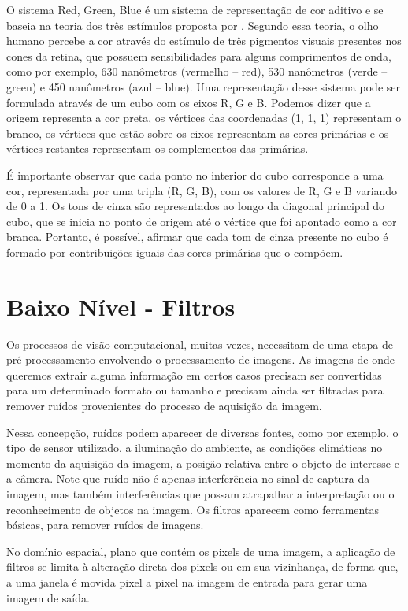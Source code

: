 O sistema Red, Green, Blue é um sistema de representação de cor aditivo \cite{Bimbo} e se baseia na teoria dos três estímulos proposta por . Segundo essa teoria, o olho humano percebe a cor através do estímulo de três pigmentos visuais presentes nos cones da retina, que possuem sensibilidades para alguns comprimentos de onda, como por exemplo, 630 nanômetros (vermelho – red), 530 nanômetros (verde – green) e 450 nanômetros (azul – blue). Uma representação desse sistema pode ser formulada através de um cubo com os eixos R, G e B. Podemos dizer que a origem representa a cor preta, os vértices das coordenadas (1, 1, 1) representam o branco, os vértices que estão sobre os eixos representam as cores primárias e os vértices restantes representam os complementos das primárias. 

É importante observar que cada ponto no interior do cubo corresponde a uma cor, representada por uma tripla (R, G, B), com os valores de R, G e B variando de 0 a 1. Os tons de cinza são representados ao longo da diagonal principal do cubo, que se inicia no ponto de origem até o vértice que foi apontado como a cor branca. Portanto, é possível, afirmar que cada tom de cinza presente no cubo é formado por contribuições iguais das cores primárias que o compõem. 


\section{Baixo Nível - Filtros}

Os processos de visão computacional, muitas vezes, necessitam de uma etapa de pré-processamento envolvendo o processamento de imagens. As imagens de onde queremos extrair alguma informação em certos casos precisam ser convertidas para um determinado formato ou tamanho e precisam ainda ser filtradas para remover ruídos provenientes do processo de aquisição da imagem. \cite{Gonzalez}

Nessa concepção, ruídos podem aparecer de diversas fontes, como por exemplo, o tipo de sensor utilizado, a iluminação do ambiente, as condições climáticas no momento da aquisição da imagem, a posição relativa entre o objeto de interesse e a câmera. Note que ruído não é apenas interferência no sinal de captura da imagem, mas também interferências que possam atrapalhar a interpretação ou o reconhecimento de objetos na imagem. Os filtros aparecem como ferramentas básicas, para remover ruídos de imagens.

No domínio espacial, plano que contém os pixels de uma imagem, a aplicação de filtros se limita à alteração direta dos pixels ou em sua vizinhança, de forma que, a uma janela é movida pixel a pixel na imagem de entrada para gerar uma imagem de saída.

